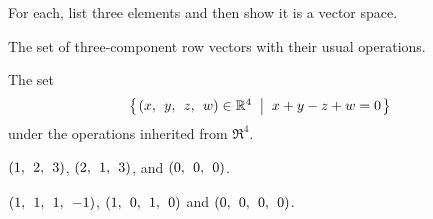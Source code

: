 
\begin{Exercise}[
name={},
title={}, 
difficulty=0,
origin={by Jim Hefferon \cite{JH}}]
For each, list three elements and then show it is a vector space.

\Question The set of three-component row vectors with their usual
        operations.

\Question The set
        \begin{equation*}
          \set{\rowvec{x,& y,& z,& w} \in\Re^4\suchthat x+y-z+w=0}
        \end{equation*}
        under the operations inherited from $\Re^4$.
\end{Exercise}

\begin{Answer}
\Question $\rowvec{1,& 2,& 3}$, $\rowvec{2,& 1,& 3}$, and $\rowvec{0,& 0,& 0}$.

\Question $\rowvec{1,& 1,& 1,& -1}$, $\rowvec{1,& 0,& 1,& 0}$ and $\rowvec{0,& 0,& 0,& 0}$.

\end{Answer}
